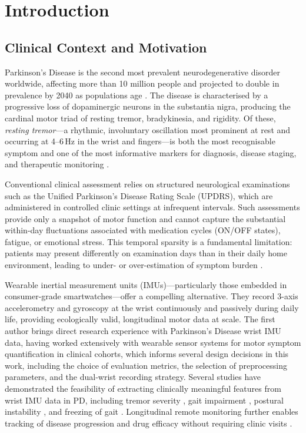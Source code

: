 \documentclass{article}
\begin{document}
\section{Introduction}
\label{sec:intro}

\subsection{Clinical Context and Motivation}

Parkinson's Disease is the second most prevalent neurodegenerative disorder
worldwide, affecting more than 10 million people and projected to double in
prevalence by 2040 as populations age \citep{poewe2017parkinson,dorsey2018global}.
The disease is characterised by a progressive loss of dopaminergic neurons in
the substantia nigra, producing the cardinal motor triad of resting tremor,
bradykinesia, and rigidity.
Of these, \emph{resting tremor}---a rhythmic, involuntary oscillation most
prominent at rest and occurring at 4--6\,Hz in the wrist and fingers---is both
the most recognisable symptom and one of the most informative markers for
diagnosis, disease staging, and therapeutic monitoring \citep{deuschl2000tremor,
jankovic2008parkinsons}.

Conventional clinical assessment relies on structured neurological examinations
such as the Unified Parkinson's Disease Rating Scale (UPDRS), which are
administered in controlled clinic settings at infrequent intervals.
Such assessments provide only a snapshot of motor function and cannot capture the
substantial within-day fluctuations associated with medication cycles (ON/OFF
states), fatigue, or emotional stress.
This temporal sparsity is a fundamental limitation: patients may present
differently on examination days than in their daily home environment, leading to
under- or over-estimation of symptom burden \citep{maetzler2013quantitative,
bloem2021telehealth}.

Wearable inertial measurement units (IMUs)---particularly those embedded in
consumer-grade smartwatches---offer a compelling alternative.
They record 3-axis accelerometry and gyroscopy at the wrist continuously and
passively during daily life, providing ecologically valid, longitudinal motor
data at scale.
The first author brings direct research experience with Parkinson's Disease
wrist IMU data, having worked extensively with wearable sensor systems for motor
symptom quantification in clinical cohorts, which informs several design
decisions in this work, including the choice of evaluation metrics, the
selection of preprocessing parameters, and the dual-wrist recording strategy.
Several studies have demonstrated the feasibility of extracting clinically
meaningful features from wrist IMU data in PD, including tremor severity
\citep{rigas2012assessment}, gait impairment \citep{salarian2004gait},
postural instability \citep{mancini2011trunk}, and freezing of gait
\citep{camps2018deep}.
Longitudinal remote monitoring further enables tracking of disease
progression and drug efficacy without requiring clinic visits
\citep{patel2009monitoring,lonini2018smartwatch,delrobaei2018ambulatory}.
\end{document}
